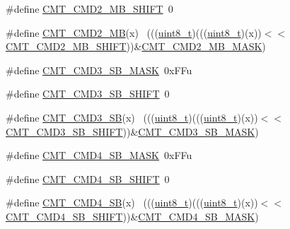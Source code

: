 \begin{DoxyCompactItemize}
\item 
\#define \hyperlink{group___c_m_t___register___masks_gaeff28d00f2825fc455b2f37c218ce24f}{C\+M\+T\+\_\+\+C\+M\+D2\+\_\+\+M\+B\+\_\+\+S\+H\+I\+FT}~0
\item 
\#define \hyperlink{group___c_m_t___register___masks_gab2a79ddcd28a1921a654f06e9c9cb15f}{C\+M\+T\+\_\+\+C\+M\+D2\+\_\+\+MB}(x)                                                  ~(((\hyperlink{_p_e___types_8h_aba7bc1797add20fe3efdf37ced1182c5}{uint8\+\_\+t})(((\hyperlink{_p_e___types_8h_aba7bc1797add20fe3efdf37ced1182c5}{uint8\+\_\+t})(x))$<$$<$\hyperlink{group___c_m_t___register___masks_gaeff28d00f2825fc455b2f37c218ce24f}{C\+M\+T\+\_\+\+C\+M\+D2\+\_\+\+M\+B\+\_\+\+S\+H\+I\+FT}))\&\hyperlink{group___c_m_t___register___masks_gac9616164033684cd0d73e63eb6381441}{C\+M\+T\+\_\+\+C\+M\+D2\+\_\+\+M\+B\+\_\+\+M\+A\+SK})
\item 
\#define \hyperlink{group___c_m_t___register___masks_ga0ee814da2957c935fad8b236d52b22f5}{C\+M\+T\+\_\+\+C\+M\+D3\+\_\+\+S\+B\+\_\+\+M\+A\+SK}~0x\+F\+Fu
\item 
\#define \hyperlink{group___c_m_t___register___masks_ga87210814a860e3ea66f06747156fbd9a}{C\+M\+T\+\_\+\+C\+M\+D3\+\_\+\+S\+B\+\_\+\+S\+H\+I\+FT}~0
\item 
\#define \hyperlink{group___c_m_t___register___masks_gaef6988a6aed5fc7ec042e6db619d568b}{C\+M\+T\+\_\+\+C\+M\+D3\+\_\+\+SB}(x)                                                  ~(((\hyperlink{_p_e___types_8h_aba7bc1797add20fe3efdf37ced1182c5}{uint8\+\_\+t})(((\hyperlink{_p_e___types_8h_aba7bc1797add20fe3efdf37ced1182c5}{uint8\+\_\+t})(x))$<$$<$\hyperlink{group___c_m_t___register___masks_ga87210814a860e3ea66f06747156fbd9a}{C\+M\+T\+\_\+\+C\+M\+D3\+\_\+\+S\+B\+\_\+\+S\+H\+I\+FT}))\&\hyperlink{group___c_m_t___register___masks_ga0ee814da2957c935fad8b236d52b22f5}{C\+M\+T\+\_\+\+C\+M\+D3\+\_\+\+S\+B\+\_\+\+M\+A\+SK})
\item 
\#define \hyperlink{group___c_m_t___register___masks_ga634397e39fb458afba9c0cfefdfc36d8}{C\+M\+T\+\_\+\+C\+M\+D4\+\_\+\+S\+B\+\_\+\+M\+A\+SK}~0x\+F\+Fu
\item 
\#define \hyperlink{group___c_m_t___register___masks_gac4d14f573bc993ac68f7cc9242fbe888}{C\+M\+T\+\_\+\+C\+M\+D4\+\_\+\+S\+B\+\_\+\+S\+H\+I\+FT}~0
\item 
\#define \hyperlink{group___c_m_t___register___masks_ga346b641d1b301aa99d317d8a98c62c97}{C\+M\+T\+\_\+\+C\+M\+D4\+\_\+\+SB}(x)                                                  ~(((\hyperlink{_p_e___types_8h_aba7bc1797add20fe3efdf37ced1182c5}{uint8\+\_\+t})(((\hyperlink{_p_e___types_8h_aba7bc1797add20fe3efdf37ced1182c5}{uint8\+\_\+t})(x))$<$$<$\hyperlink{group___c_m_t___register___masks_gac4d14f573bc993ac68f7cc9242fbe888}{C\+M\+T\+\_\+\+C\+M\+D4\+\_\+\+S\+B\+\_\+\+S\+H\+I\+FT}))\&\hyperlink{group___c_m_t___register___masks_ga634397e39fb458afba9c0cfefdfc36d8}{C\+M\+T\+\_\+\+C\+M\+D4\+\_\+\+S\+B\+\_\+\+M\+A\+SK})
$$
\end{DoxyCompactItemize}

